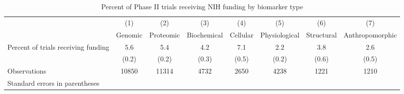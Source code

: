 \begin{table}[htbp]\centering
\caption{Percent of Phase II trials receiving NIH funding by biomarker type}
\begin{tabular}{l*{7}{c}}
\hline\hline
                    &\multicolumn{1}{c}{(1)}&\multicolumn{1}{c}{(2)}&\multicolumn{1}{c}{(3)}&\multicolumn{1}{c}{(4)}&\multicolumn{1}{c}{(5)}&\multicolumn{1}{c}{(6)}&\multicolumn{1}{c}{(7)}\\
                    &\multicolumn{1}{c}{Genomic}&\multicolumn{1}{c}{Proteomic}&\multicolumn{1}{c}{Biochemical}&\multicolumn{1}{c}{Cellular}&\multicolumn{1}{c}{Physiological}&\multicolumn{1}{c}{Structural}&\multicolumn{1}{c}{Anthropomorphic}\\
\hline
Percent of trials receiving funding&         5.6&         5.4&         4.2&         7.1&         2.2&         3.8&         2.6\\
                    &       (0.2)&       (0.2)&       (0.3)&       (0.5)&       (0.2)&       (0.6)&       (0.5)\\
\hline
Observations        &       10850&       11314&        4732&        2650&        4238&        1221&        1210\\
\hline\hline
\multicolumn{8}{l}{\footnotesize Standard errors in parentheses}\\
\end{tabular}
\end{table}
